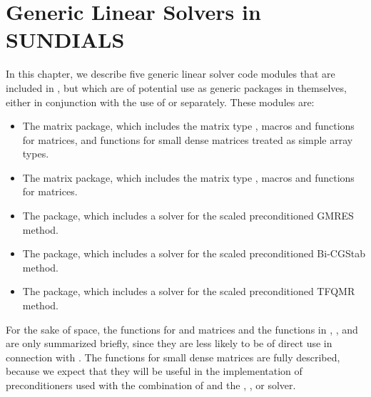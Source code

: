 \chapter{Generic Linear Solvers in SUNDIALS}\label{s:gen_linsolv}
In this chapter, we describe five generic linear solver code modules that 
are included in {\cvode}, but which are of potential use as generic packages in
themselves, either in conjunction with the use of {\cvode} or separately.
These modules are:
\begin{itemize}
\item The {\dense} matrix package, which includes the matrix type ,
      macros and functions for  matrices, and functions
      for small dense matrices treated as simple array types.
\item The {\band} matrix package, which includes the matrix type ,
      macros and functions for  matrices.
\item The {\spgmr} package, which includes a solver for the scaled
      preconditioned GMRES method.
\item The {\spbcg} package, which includes a solver for the scaled
      preconditioned Bi-CGStab method.
\item The {\sptfqmr} package, which includes a solver for the scaled
      preconditioned TFQMR method.
\end{itemize}

For the sake of space, the functions for  and
 matrices and the functions in {\spgmr}, {\spbcg}, and {\sptfqmr}
are only summarized briefly, since they are less likely to be of direct use
in connection with {\cvode}.  The functions for small dense matrices are fully
described, because we expect that they will be useful in the
implementation of preconditioners used with the combination of {\cvode}
and the {\cvspgmr}, {\cvspbcg}, or {\cvsptfqmr} solver.








